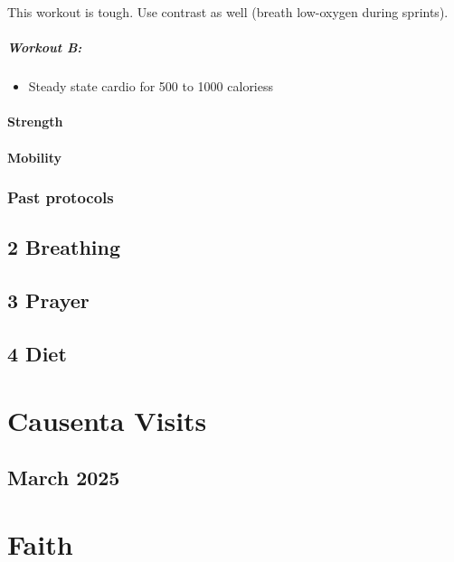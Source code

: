 \documentclass[
  letterpaper,
  DIV=11,
  numbers=noendperiod]{scrreprt}
\providecommand{\tightlist}{%
  \setlength{\itemsep}{0pt}\setlength{\parskip}{0pt}}\usepackage{longtable,booktabs,array}
\begin{document}
This workout is tough. Use contrast as well (breath low-oxygen during
sprints).

\subsubsection{Workout B:}\label{workout-b}

\begin{itemize}
\tightlist
\item
  Steady state cardio for 500 to 1000 caloriess
\end{itemize}

\subsection{Strength}\label{strength}

\subsection{Mobility}\label{mobility}

\section{Past protocols}\label{past-protocols}

\chapter{2 Breathing}\label{breathing}

\chapter{3 Prayer}\label{prayer}

\chapter{4 Diet}\label{diet}

\part{Causenta Visits}

\chapter{March 2025}\label{march-2025}

\part{Faith}
\end{document}
